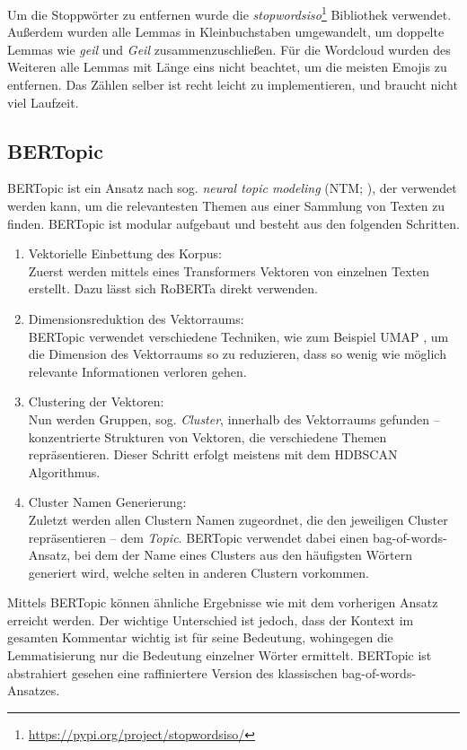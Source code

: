 Um die Stoppwörter zu entfernen wurde die \emph{stopwordsiso}\footnote{\url{https://pypi.org/project/stopwordsiso/}} Bibliothek verwendet.
Außerdem wurden alle Lemmas in Kleinbuchstaben umgewandelt, um doppelte Lemmas wie \emph{geil} und \emph {Geil} zusammenzuschließen.
Für die Wordcloud wurden des Weiteren alle Lemmas mit Länge eins nicht beachtet, um die meisten Emojis zu entfernen.
Das Zählen selber ist recht leicht zu implementieren, und braucht nicht viel Laufzeit.

\subsection{BERTopic}
BERTopic \autocite{Gro22} ist ein Ansatz nach sog. \emph{neural topic modeling} (NTM; \textcite{Wu24}), der verwendet werden kann, um die relevantesten Themen aus einer Sammlung von Texten zu finden.
BERTopic ist modular aufgebaut und besteht aus den folgenden Schritten.
\begin{enumerate}
    \item Vektorielle Einbettung des Korpus: \\
        Zuerst werden mittels eines Transformers Vektoren von einzelnen Texten erstellt.
        Dazu lässt sich RoBERTa direkt verwenden.

    \item Dimensionsreduktion des Vektorraums: \\
        BERTopic verwendet verschiedene Techniken, wie zum Beispiel UMAP \autocite{MHM20}, um die Dimension des Vektorraums so zu reduzieren, dass so wenig wie möglich relevante Informationen verloren gehen.

    \item Clustering der Vektoren: \\
        Nun werden Gruppen, sog. \emph{Cluster}, innerhalb des Vektorraums gefunden -- konzentrierte Strukturen von Vektoren, die verschiedene Themen repräsentieren.
        Dieser Schritt erfolgt meistens mit dem HDBSCAN \autocite{MB19} Algorithmus.

    \item Cluster Namen Generierung: \\
        Zuletzt werden allen Clustern Namen zugeordnet, die den jeweiligen Cluster repräsentieren -- dem \emph{Topic}.
        BERTopic verwendet dabei einen bag-of-words-Ansatz, bei dem der Name eines Clusters aus den häufigsten Wörtern generiert wird, welche selten in anderen Clustern vorkommen.
\end{enumerate}
Mittels BERTopic können ähnliche Ergebnisse wie mit dem vorherigen Ansatz erreicht werden.
Der wichtige Unterschied ist jedoch, dass der Kontext im gesamten Kommentar wichtig ist für seine Bedeutung, wohingegen die Lemmatisierung nur die Bedeutung einzelner Wörter ermittelt.
BERTopic ist abstrahiert gesehen eine raffiniertere Version des klassischen bag-of-words-Ansatzes.

